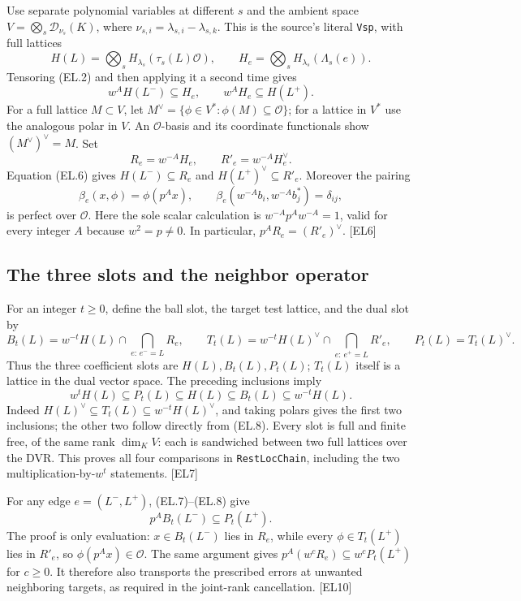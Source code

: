 Use separate polynomial variables at different $s$ and the ambient space
$V=\bigotimes_s\mathcal D_{\nu_s}(K)$, where $\nu_{s,i}=\lambda_{s,i}-\lambda_{s,k}$.
This is the source's literal \texttt{Vsp}, with full lattices
\[
 H(L)=\bigotimes_s H_{\lambda_s}(\tau_s(L)\mathcal O),
 \qquad
 H_e=\bigotimes_s H_{\lambda_s}(\Lambda_s(e)).
\]
Tensoring (EL.2) and then applying it a second time gives
\[
 w^A H(L^-)\subseteq H_e,\qquad
 w^A H_e\subseteq H(L^+).
 \tag{EL.6}
\]
For a full lattice $M\subset V$, let
$M^\vee=\{\phi\in V^*:\phi(M)\subseteq\mathcal O\}$; for a lattice in $V^*$ use the analogous polar in $V$.
An $\mathcal O$-basis and its coordinate functionals show
$(M^\vee)^\vee=M$.
Set
\[
 R_e=w^{-A}H_e,\qquad R'_e=w^{-A}H_e^\vee.
\]
Equation (EL.6) gives
$H(L^-)\subseteq R_e$ and $H(L^+)^\vee\subseteq R'_e$.
Moreover the pairing
\[
 \beta_e(x,\phi)=\phi(p^A x),\qquad
 \beta_e(w^{-A}b_i,w^{-A}b_j^*)=\delta_{ij},
 \tag{EL.7}
\]
is perfect over $\mathcal O$. Here the sole scalar calculation is
$w^{-A}p^Aw^{-A}=1$, valid for every integer $A$ because $w^2=p\ne0$.
In particular,
$p^A R_e=(R'_e)^\vee$.
\textsf{[EL6]}

\subsection{The three slots and the neighbor operator}

For an integer $t\ge0$, define the ball slot, the target test lattice, and the dual slot by
\[
 B_t(L)=w^{-t}H(L)\cap\bigcap_{e:\,e^-=L}R_e,\qquad
 T_t(L)=w^{-t}H(L)^\vee\cap\bigcap_{e:\,e^+=L}R'_e,\qquad
 P_t(L)=T_t(L)^\vee .
 \tag{EL.8}
\]
Thus the three coefficient slots are $H(L),B_t(L),P_t(L)$;
$T_t(L)$ itself is a lattice in the dual vector space.
The preceding inclusions imply
\[
 \boxed{\quad
 w^tH(L)\subseteq P_t(L)\subseteq H(L)
       \subseteq B_t(L)\subseteq w^{-t}H(L).
 \quad}
 \tag{EL.9}
\]
Indeed $H(L)^\vee\subseteq T_t(L)\subseteq w^{-t}H(L)^\vee$, and taking polars gives the first two inclusions; the other two follow directly from (EL.8).
Every slot is full and finite free, of the same rank $\dim_K V$: each is sandwiched between two full lattices over the DVR.
This proves all four comparisons in \texttt{RestLocChain}, including the two multiplication-by-$w^t$ statements. \textsf{[EL7]}

For any edge $e=(L^-,L^+)$, (EL.7)--(EL.8) give
\[
 \boxed{\qquad p^A B_t(L^-)\subseteq P_t(L^+).\qquad}
 \tag{EL.10}
\]
The proof is only evaluation: $x\in B_t(L^-)$ lies in $R_e$, while every $\phi\in T_t(L^+)$ lies in $R'_e$, so $\phi(p^Ax)\in\mathcal O$.
The same argument gives
$p^A(w^cR_e)\subseteq w^cP_t(L^+)$ for $c\ge0$.
It therefore also transports the prescribed errors at unwanted neighboring targets, as required in the joint-rank cancellation. \textsf{[EL10]}

